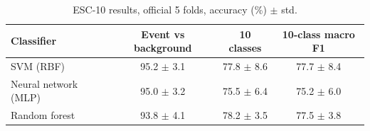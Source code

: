 \begin{table}[H]\centering\small\caption{ESC-10 results, official 5 folds, accuracy (\%) $\pm$ std.}\label{tab:esc}
\begin{tabular}{lccc}\toprule Classifier & Event vs background & 10 classes & 10-class macro F1\\\midrule
SVM (RBF) & 95.2 $\pm$ 3.1 & 77.8 $\pm$ 8.6 & 77.7 $\pm$ 8.4\\
Neural network (MLP) & 95.0 $\pm$ 3.2 & 75.5 $\pm$ 6.4 & 75.2 $\pm$ 6.0\\
Random forest & 93.8 $\pm$ 4.1 & 78.2 $\pm$ 3.5 & 77.5 $\pm$ 3.8\\
\bottomrule\end{tabular}\end{table}
